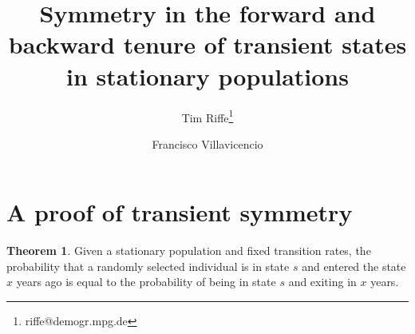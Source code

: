 \documentclass[12pt,oneside,a4paper]{article} %
\theoremstyle{definition}
\newtheorem{theorem}{Theorem}[section]
\begin{document}
\title{Symmetry in the forward and backward tenure of transient states in
stationary populations}
\author[1]{Tim Riffe\thanks{riffe@demogr.mpg.de}}
\author[2,3]{Francisco Villavicencio}

\maketitle

\begin{abstract}

\end{abstract}

\section{A proof of transient symmetry}

\begin{theorem}
Given a stationary population and fixed transition rates, the probability that a
randomly selected individual is in state  $s$ and entered the state $x$ years
ago is equal to the probability of being in state $s$ and exiting in $x$ years.
\end{theorem}
\end{document}
